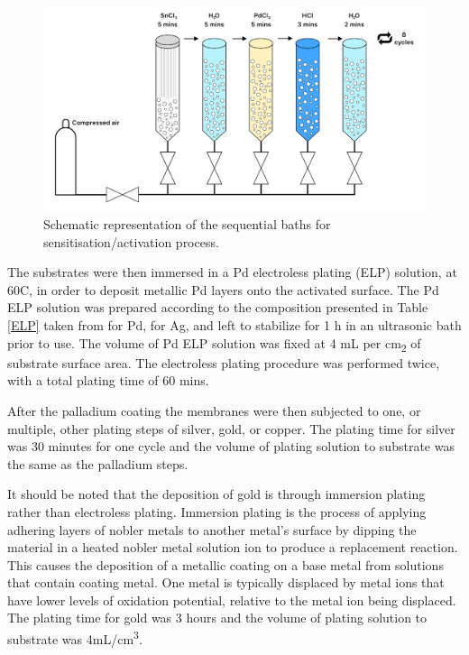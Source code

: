 \begin{figure}
    \includegraphics[width=\linewidth]{figures/pretreatment.png}
    \caption{Schematic representation of the sequential baths for sensitisation/activation process.}
    \label{sintering}
  \end{figure}

The substrates were then immersed in a Pd electroless plating (ELP) solution, at 60\textdegree C, in order to deposit metallic Pd layers onto the activated surface. The Pd ELP solution was prepared according to the composition presented in Table \ref{ELP} taken from \cite{GouveiaGil2015} for Pd, \cite{Braun2014} for Ag, \cite{Pomerantz2009}  and left to stabilize for 1 h in an ultrasonic bath prior to use. The volume of Pd ELP solution was fixed at 4 mL per cm\textsubscript{2} of 
substrate surface area. The electroless plating procedure was performed twice, with a total plating time of 60 mins.

After the palladium coating the membranes were then subjected to one, or multiple, other plating steps of silver, gold, or copper. The plating time for silver was 30 minutes for one cycle and the volume of plating solution to substrate was the same as the palladium steps.

It should be noted that the deposition of gold is through immersion plating rather than electroless plating. \cite{adawiyah_azlina_fadil_aisha_hanim_2016} Immersion plating is the process of applying adhering layers of nobler metals to another metal's surface by dipping the material in a heated nobler metal solution ion to produce a replacement reaction. This causes the deposition of a metallic coating on a base metal from solutions that contain coating metal. One metal is typically displaced by metal ions that have lower levels of oxidation potential, relative to the metal ion being displaced. The plating time for gold was 3 hours and the volume of plating solution to substrate was 4mL/cm\textsuperscript{3}. 

